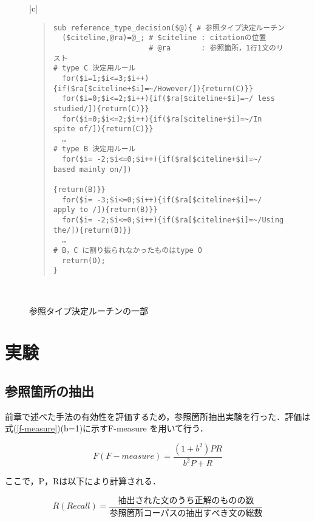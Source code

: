 {\small
\begin{figure}[t]
\centering
\begin{tabular}{|c|}\hline
\begin{minipage}[c]{13.5cm}
\vspace{0.3cm}
\begin{quote}
\begin{verbatim}
sub reference_type_decision($@){ # 参照タイプ決定ルーチン
  ($citeline,@ra)=@_; # $citeline : citationの位置
                      # @ra       : 参照箇所，1行1文のリスト         
# type C 決定用ルール
  for($i=1;$i<=3;$i++){if($ra[$citeline+$i]=~/However/]){return(C)}}
  for($i=0;$i<=2;$i++){if($ra[$citeline+$i]=~/ less studied/]){return(C)}}
  for($i=0;$i<=2;$i++){if($ra[$citeline+$i]=~/In spite of/]){return(C)}}
  …
# type B 決定用ルール
  for($i= -2;$i<=0;$i++){if($ra[$citeline+$i]=~/ based mainly on/])
                                                             {return(B)}}
  for($i= -3;$i<=0;$i++){if($ra[$citeline+$i]=~/ apply to /]){return(B)}}
  for($i= -2;$i<=0;$i++){if($ra[$citeline+$i]=~/Using the/]){return(B)}}
  …
# B，C に割り振られなかったものはtype O
  return(O);
}
\end{verbatim}
\end{quote}  
\end{minipage}
 \\ \hline
\end{tabular}
\caption{参照タイプ決定ルーチンの一部\label{fig:type_decision}}
\end{figure}
}

\section{実験}

\subsection{参照箇所の抽出}

前章で述べた手法の有効性を評価するため，参照箇所抽出実験を行った．評価は
式(\ref{f-measure})(b=1)に示すF-measure\cite{rijsbergen79} を用いて行う．

\begin{equation}
 \label{f-measure}
  F(F-measure)=\frac{(1+b^2) P R}{b^2 P+R}
\end{equation}

ここで，P，Rは以下により計算される．

\begin{equation}
 R(Recall) = 
 \frac{
  抽出された文のうち正解のものの数
 }{
 参照箇所コーパスの抽出すべき文の総数
 }
\end{equation}


